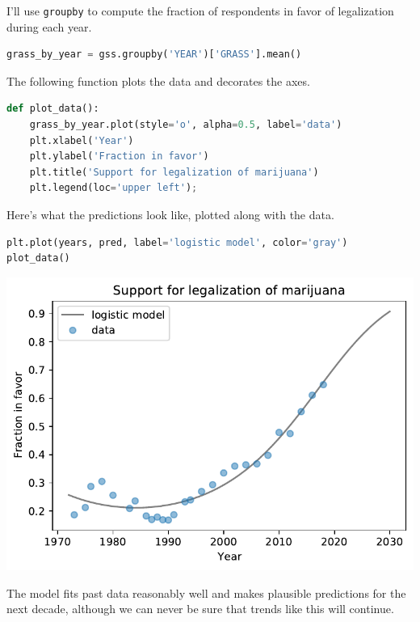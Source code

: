 I'll use \passthrough{\lstinline!groupby!} to compute the fraction of
respondents in favor of legalization during each year.

\begin{lstlisting}[language=Python,style=source]
grass_by_year = gss.groupby('YEAR')['GRASS'].mean()
\end{lstlisting}

The following function plots the data and decorates the axes.

\begin{lstlisting}[language=Python,style=source]
def plot_data():
    grass_by_year.plot(style='o', alpha=0.5, label='data')
    plt.xlabel('Year')
    plt.ylabel('Fraction in favor')
    plt.title('Support for legalization of marijuana')
    plt.legend(loc='upper left');
\end{lstlisting}

Here's what the predictions look like, plotted along with the data.

\begin{lstlisting}[language=Python,style=source]
plt.plot(years, pred, label='logistic model', color='gray')
plot_data()
\end{lstlisting}

\begin{center}
\includegraphics[scale=0.75]{12_bootstrap_files/12_bootstrap_144_0.pdf}
\end{center}

The model fits past data reasonably well and makes plausible predictions
for the next decade, although we can never be sure that trends like this
will continue.

